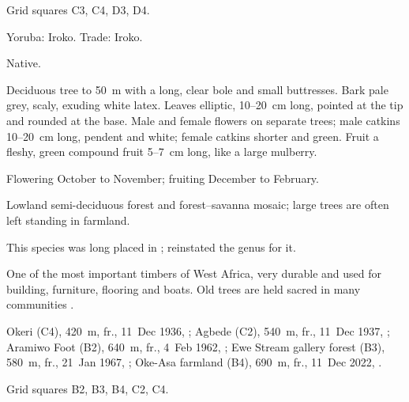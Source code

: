  Grid squares C3, C4, D3, D4.

\begin{center}
\end{center}

\label{sp:MOR02}

 

 Yoruba: Iroko. Trade: Iroko.

 Native.

 Deciduous tree to 50~m with a long, clear bole and
small buttresses. Bark pale grey, scaly, exuding white latex. Leaves
elliptic, 10--20~cm long, pointed at the tip and rounded at the base.
Male and female flowers on separate trees; male catkins 10--20~cm
long, pendent and white; female catkins shorter and green. Fruit a
fleshy, green compound fruit 5--7~cm long, like a large mulberry.

 Flowering October to November; fruiting December to
February.

 Lowland semi-deciduous forest and forest--savanna
mosaic; large trees are often left standing in farmland.

 This species was long placed in ;
\citet{berg1982} reinstated the genus  for it.

 One of the most important timbers of West Africa, very
durable and used for building, furniture, flooring and boats. Old
trees are held sacred in many communities \citep{keay1989,louppe2008}.

 Okeri (C4), 420~m, fr., 11~Dec 1936, ;
Agbede (C2), 540~m, fr., 11~Dec 1937, ;
Aramiwo Foot (B2), 640~m, fr., 4~Feb 1962, ;
Ewe Stream gallery forest (B3), 580~m, fr., 21~Jan 1967, ;
Oke-Asa farmland (B4), 690~m, fr., 11~Dec 2022, .

 Grid squares B2, B3, B4, C2, C4.

\begin{center}
\end{center}